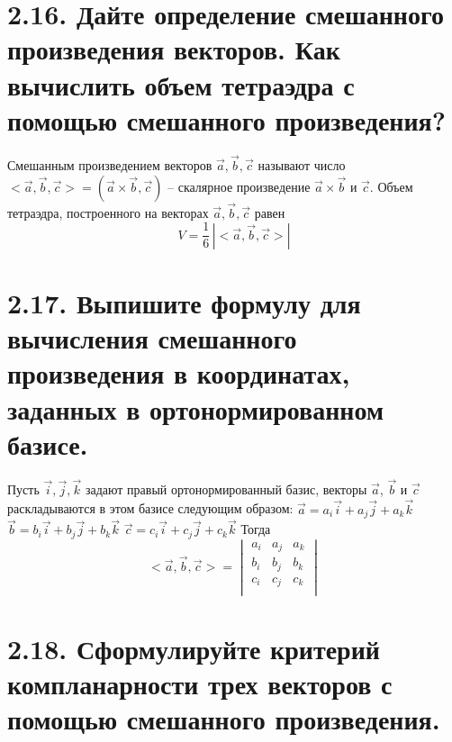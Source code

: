 \documentclass{article}
\begin{document}
\section*{\LARGE 2.16. Дайте определение смешанного произведения векторов. Как вычислить объем тетраэдра с помощью смешанного произведения?  }

Смешанным произведением векторов $\vec{a}, \vec{b}, \vec{c}$ называют число $<\vec{a}, \vec{b}, \vec{c}> = (\vec{a} \times \vec{b}, \vec{c})$ -- скалярное произведение $\vec{a} \times \vec{b}$ и $\vec{c}$.  Объем тетраэдра, построенного на векторах $\vec{a}, \vec{b}, \vec{c}$ равен
$$
V = \frac{1}{6}\,|<\vec{a}, \vec{b}, \vec{c}>|
$$

\section*{\LARGE 2.17. Выпишите формулу для вычисления смешанного произведения в координатах, заданных в ортонормированном базисе.  }

Пусть $\vec{i}, \vec{j}, \vec{k}$ задают правый ортонормированный базис, векторы $\vec{a}$, $\vec{b}$ и $\vec{c}$ раскладываются в этом базисе следующим образом:
\newline $\vec{a} = a_i\vec{i} + a_j\vec{j} + a_k\vec{k}$
\newline $\vec{b} = b_i\vec{i} + b_j\vec{j} + b_k\vec{k}$
\newline $\vec{c} = c_i\vec{i} + c_j\vec{j} + c_k\vec{k}$
\newline Тогда 
$$<\vec{a}, \vec{b}, \vec{c}> = 
\begin{vmatrix}
a_i & a_j & a_k \\
b_i & b_j & b_k \\
c_i & c_j & c_k \\
\end{vmatrix}$$

\section*{\LARGE 2.18. Сформулируйте критерий компланарности трех векторов с помощью смешанного произведения. }
\end{document}
